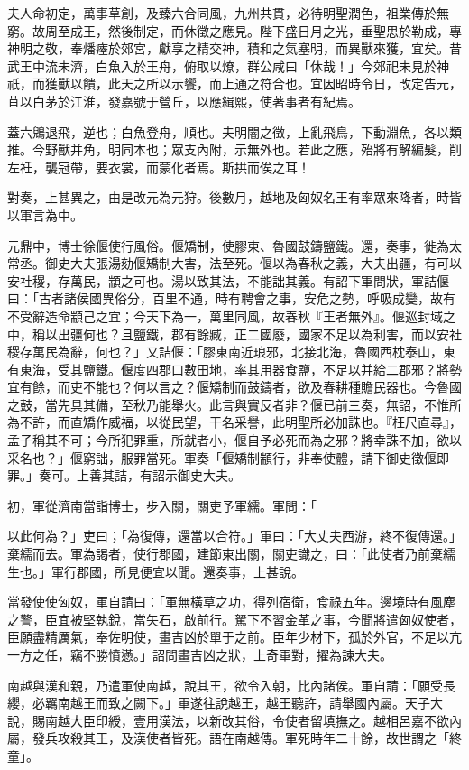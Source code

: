 \begin{pinyinscope}
夫人命初定，萬事草創，及臻六合同風，九州共貫，必待明聖潤色，祖業傳於無窮。故周至成王，然後制定，而休徵之應見。陛下盛日月之光，垂聖思於勒成，專神明之敬，奉燔瘞於郊宮，獻享之精交神，積和之氣塞明，而異獸來獲，宜矣。昔武王中流未濟，白魚入於王舟，俯取以燎，群公咸曰「休哉！」今郊祀未見於神祇，而獲獸以饋，此天之所以示饗，而上通之符合也。宜因昭時令日，改定告元，苴以白茅於江淮，發嘉號于營丘，以應緝熙，使著事者有紀焉。

蓋六鶂退飛，逆也；白魚登舟，順也。夫明闇之徵，上亂飛鳥，下動淵魚，各以類推。今野獸并角，明同本也；眾支內附，示無外也。若此之應，殆將有解編髮，削左衽，襲冠帶，要衣裳，而蒙化者焉。斯拱而俟之耳！

對奏，上甚異之，由是改元為元狩。後數月，越地及匈奴名王有率眾來降者，時皆以軍言為中。

元鼎中，博士徐偃使行風俗。偃矯制，使膠東、魯國鼓鑄鹽鐵。還，奏事，徙為太常丞。御史大夫張湯劾偃矯制大害，法至死。偃以為春秋之義，大夫出疆，有可以安社稷，存萬民，顓之可也。湯以致其法，不能詘其義。有詔下軍問狀，軍詰偃曰：「古者諸侯國異俗分，百里不通，時有聘會之事，安危之勢，呼吸成變，故有不受辭造命顓己之宜；今天下為一，萬里同風，故春秋『王者無外』。偃巡封域之中，稱以出疆何也？且鹽鐵，郡有餘臧，正二國廢，國家不足以為利害，而以安社稷存萬民為辭，何也？」又詰偃：「膠東南近琅邪，北接北海，魯國西枕泰山，東有東海，受其鹽鐵。偃度四郡口數田地，率其用器食鹽，不足以并給二郡邪？將勢宜有餘，而吏不能也？何以言之？偃矯制而鼓鑄者，欲及春耕種贍民器也。今魯國之鼓，當先具其備，至秋乃能舉火。此言與實反者非？偃已前三奏，無詔，不惟所為不許，而直矯作威福，以從民望，干名采譽，此明聖所必加誅也。『枉尺直尋』，孟子稱其不可；今所犯罪重，所就者小，偃自予必死而為之邪？將幸誅不加，欲以采名也？」偃窮詘，服罪當死。軍奏「偃矯制顓行，非奉使體，請下御史徵偃即罪。」奏可。上善其詰，有詔示御史大夫。

初，軍從濟南當詣博士，步入關，關吏予軍繻。軍問：「

以此何為？」吏曰；「為復傳，還當以合符。」軍曰：「大丈夫西游，終不復傳還。」棄繻而去。軍為謁者，使行郡國，建節東出關，關吏識之，曰：「此使者乃前棄繻生也。」軍行郡國，所見便宜以聞。還奏事，上甚說。

當發使使匈奴，軍自請曰：「軍無橫草之功，得列宿衛，食祿五年。邊境時有風塵之警，臣宜被堅執銳，當矢石，啟前行。駑下不習金革之事，今聞將遣匈奴使者，臣願盡精厲氣，奉佐明使，畫吉凶於單于之前。臣年少材下，孤於外官，不足以亢一方之任，竊不勝憤懣。」詔問畫吉凶之狀，上奇軍對，擢為諫大夫。

南越與漢和親，乃遣軍使南越，說其王，欲令入朝，比內諸侯。軍自請：「願受長纓，必羈南越王而致之闕下。」軍遂往說越王，越王聽許，請舉國內屬。天子大說，賜南越大臣印綬，壹用漢法，以新改其俗，令使者留填撫之。越相呂嘉不欲內屬，發兵攻殺其王，及漢使者皆死。語在南越傳。軍死時年二十餘，故世謂之「終童」。


\end{pinyinscope}
